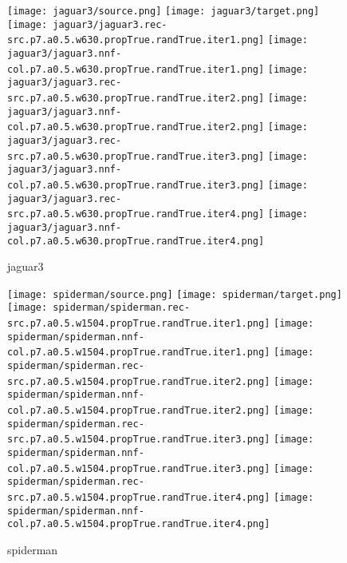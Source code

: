 \documentclass{article}
\begin{document}
\begin{figure}[H]
\centering
\texttt{[image: jaguar3/source.png]}\enskip
\texttt{[image: jaguar3/target.png]}
\texttt{[image: jaguar3/jaguar3.rec-src.p7.a0.5.w630.propTrue.randTrue.iter1.png]}\enskip
\texttt{[image: jaguar3/jaguar3.nnf-col.p7.a0.5.w630.propTrue.randTrue.iter1.png]}
\texttt{[image: jaguar3/jaguar3.rec-src.p7.a0.5.w630.propTrue.randTrue.iter2.png]}\enskip
\texttt{[image: jaguar3/jaguar3.nnf-col.p7.a0.5.w630.propTrue.randTrue.iter2.png]}
\texttt{[image: jaguar3/jaguar3.rec-src.p7.a0.5.w630.propTrue.randTrue.iter3.png]}\enskip
\texttt{[image: jaguar3/jaguar3.nnf-col.p7.a0.5.w630.propTrue.randTrue.iter3.png]}
\texttt{[image: jaguar3/jaguar3.rec-src.p7.a0.5.w630.propTrue.randTrue.iter4.png]}\enskip
\texttt{[image: jaguar3/jaguar3.nnf-col.p7.a0.5.w630.propTrue.randTrue.iter4.png]}
\caption{jaguar3}
\end{figure}

\begin{figure}[H]
\centering
\texttt{[image: spiderman/source.png]}\enskip
\texttt{[image: spiderman/target.png]}
\texttt{[image: spiderman/spiderman.rec-src.p7.a0.5.w1504.propTrue.randTrue.iter1.png]}\enskip
\texttt{[image: spiderman/spiderman.nnf-col.p7.a0.5.w1504.propTrue.randTrue.iter1.png]}
\texttt{[image: spiderman/spiderman.rec-src.p7.a0.5.w1504.propTrue.randTrue.iter2.png]}\enskip
\texttt{[image: spiderman/spiderman.nnf-col.p7.a0.5.w1504.propTrue.randTrue.iter2.png]}
\texttt{[image: spiderman/spiderman.rec-src.p7.a0.5.w1504.propTrue.randTrue.iter3.png]}\enskip
\texttt{[image: spiderman/spiderman.nnf-col.p7.a0.5.w1504.propTrue.randTrue.iter3.png]}
\texttt{[image: spiderman/spiderman.rec-src.p7.a0.5.w1504.propTrue.randTrue.iter4.png]}\enskip
\texttt{[image: spiderman/spiderman.nnf-col.p7.a0.5.w1504.propTrue.randTrue.iter4.png]}
\caption{spiderman}
\end{figure}
\end{document}
